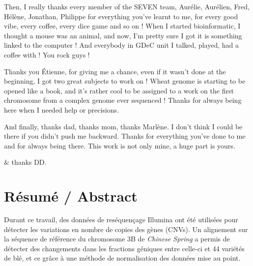 \documentclass[a4paper, 12pt]{article}
\newcommand{\nocontentsline}[3]{}
\newcommand{\tocless}[2]{\bgroup\let\addcontentsline=\nocontentsline#1{#2}\egroup}
\begin{document}
\begin{onehalfspace}
\vspace{0.5cm}

Then, I really thanks every member of the SEVEN team, Aurélie, Aurélien, Fred, Hélène, Jonathan, Philippe for everything you've learnt to me, for every good vibe, every coffee, every dice game and so on ! When I started bioinformatic, I thought a mouse was an animal, and now, I'm pretty sure I got it is something linked to the computer ! And everybody in GDeC unit I talked, played, had a coffee with ! You rock guys !

\vspace{0.5cm}

Thanks you Étienne, for giving me a chance, even if it wasn't done at the beginning, I got two great subjects to work on ! Wheat genome is starting to be opened like a book, and it's rather cool to be assigned to a work on the first chromosome from a complex genome ever sequenced ! Thanks for always being here when I needed help or precisions.

\vspace{0.5cm}

And finally, thanks dad, thanks mom, thanks Marlène. I don't think I could be there if you didn't push me backward. Thanks for everything you've done to me and for always being there. This work is not only mine, a huge part is yours.

\vspace{6cm}
\begin{flushright}
\& thanks DD.
\end{flushright}

\newpage
\thispagestyle{empty}
\tocless{\part*{Résumé / Abstract}}

\vspace{0.5cm}

Durant ce travail, des données de reséquençage Illumina ont été utilisées pour détecter les variations en nombre de copies des gènes (CNVs). Un alignement sur la séquence de référence du chromosome 3B de \textit{Chinese Spring} a permis de détecter des changements dans les fractions géniques entre celle-ci et 44 variétés de blé, et ce grâce à une méthode de normalisation des données mise au point.


\end{onehalfspace}
\end{document}
